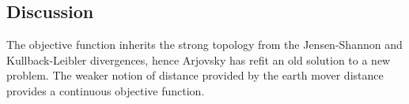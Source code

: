 \subsection{Discussion}

The objective function inherits the strong topology from the
Jensen-Shannon and Kullback-Leibler divergences, hence Arjovsky has
refit an old solution to a new problem.  The weaker notion of distance
provided by the earth mover distance provides a continuous objective
function.

